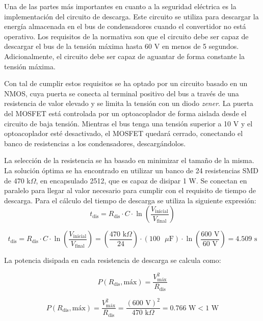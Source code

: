 Una de las partes más importantes en cuanto a la seguridad eléctrica es la implementación del circuito de descarga. Este circuito se utiliza para descargar la energía almacenada en el bus de condensadores cuando el convertidor no está operativo. Los requisitos de la normativa son que el circuito debe ser capaz de descargar el bus de la tensión máxima hasta 60 V en menos de 5 segundos. Adicionalmente, el circuito debe ser capaz de aguantar de forma constante la tensión máxima.

Con tal de cumplir estos requisitos se ha optado por un circuito basado en un NMOS, cuya puerta se conecta al terminal positivo del bus a través de una resistencia de valor elevado y se limita la tensión con un diodo \textit{zener}. La puerta del MOSFET está controlada por un optoacoplador de forma aislada desde el circuito de baja tensión. Mientras el bus tenga una tensión superior a 10 V y el optoacoplador esté desactivado, el MOSFET quedará cerrado, conectando el banco de resistencias a los condensadores, descargándolos.

La selección de la resistencia se ha basado en minimizar el tamaño de la misma. La solución óptima se ha encontrado en utilizar un banco de 24 resistencias SMD de 470 k$\Omega$, en encapsulado 2512, que es capaz de disipar 1 W. Se conectan en paralelo para llegar al valor necesario para cumplir con el requisito de tiempo de descarga. Para el cálculo del tiempo de descarga se utiliza la siguiente expresión:
\begin{equation}
	t_{\text{dis}} = R_{\text{dis}} \cdot C \cdot \ln\left(\frac{V_{\text{inicial}}}{V_{\text{final}}}\right)
\end{equation}

\[
t_{\text{dis}} = R_{\text{dis}} \cdot C \cdot \ln\left(\frac{V_{\text{inicial}}}{V_{\text{final}}}\right) = \left(\frac{470 \text{ k}\Omega}{24}\right) \cdot (100\text{ }\mu\text{F}) \cdot \ln\left(\frac{600 \text{ V}}{60 \text{ V}}\right) = 4.509 \text{ s}
\] 

La potencia disipada en cada resistencia de descarga se calcula como:

\begin{equation}
	P(R_{\text{dis}}, \text{máx}) = \frac{V_{\text{máx}}^2}{R_{\text{dis}}} 
\end{equation}

\[
P(R_{\text{dis}}, \text{máx}) = \frac{V_{\text{máx}}^2}{R_{\text{dis}}} = \frac{(600\text{ V})^2}{470 \text{ k}\Omega} = 0.766 \text{ W} < 1 \text{ W}
\]

